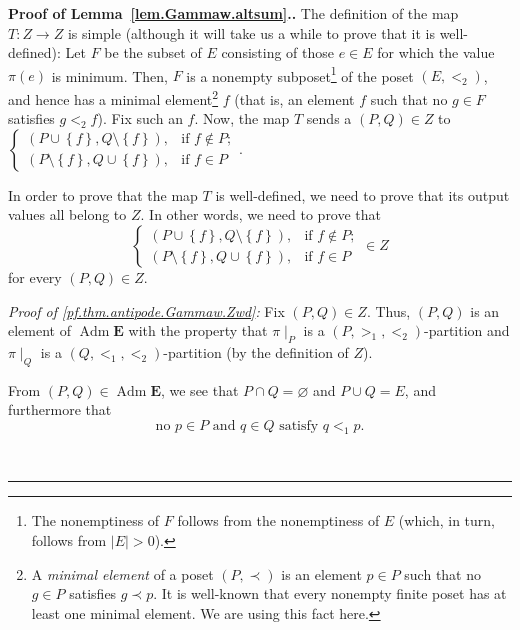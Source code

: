 \documentclass[numbers=enddot,12pt,final,onecolumn,notitlepage,abstracton]{scrartcl}
\theoremstyle{definition}
\newenvironment{proof}[1][Proof]{\noindent\textbf{#1.} }{\ \rule{0.5em}{0.5em}}
\newcommand{\Adm}{\operatorname{Adm}}
\newcommand{\EE}{{\mathbf{E}}}
\begin{document}
\begin{proof}[Proof of Lemma~\ref{lem.Gammaw.altsum}.]
The definition of the map $T : Z \to Z$
is simple (although it will take us a while to prove
that it is well-defined): Let $F$ be the subset of $E$ consisting of those
$e\in E$ for which the value $\pi \left( e \right)$ is minimum.
Then, $F$ is a nonempty
subposet\footnote{The nonemptiness of $F$ follows from the nonemptiness
of $E$ (which, in turn, follows from $\left|E\right| > 0$).}
of the poset $\left(  E,<_{2}\right)  $, and hence has a minimal
element\footnote{A \textit{minimal element} of a poset
$\left(P, \prec\right)$ is an element $p \in P$ such that no
$g \in P$ satisfies $g \prec p$. It is well-known that every nonempty
finite poset has at least one minimal element. We are using this fact
here.}
$f$ (that is, an element $f$ such that no $g\in F$ satisfies $g<_{2}
f$). Fix such an $f$. Now, the map $T$ sends a $\left(  P,Q\right)  \in Z$ to
$
\begin{cases}
\left(  P\cup\left\{  f\right\}  ,Q\setminus\left\{  f\right\}  \right)  , &
\text{if }f\notin P;\\
\left(  P\setminus\left\{  f\right\}  ,Q\cup\left\{  f\right\}  \right)  , &
\text{if }f\in P
\end{cases}
$.

In order to prove that the map $T$ is well-defined, we need to prove that its
output values all belong to $Z$. In other words, we need to prove that
\begin{equation}
\begin{cases}
\left(  P\cup\left\{  f\right\}  ,Q\setminus\left\{  f\right\}  \right)  , &
\text{if }f\notin P;\\
\left(  P\setminus\left\{  f\right\}  ,Q\cup\left\{  f\right\}  \right)  , &
\text{if }f\in P
\end{cases}
\in Z
\label{pf.thm.antipode.Gammaw.Zwd}
\end{equation}
for every $\left(  P,Q\right)  \in Z$.

\textit{Proof of \eqref{pf.thm.antipode.Gammaw.Zwd}:} Fix $\left(  P,Q\right)
\in Z$. Thus, $\left(  P,Q\right)  $ is an element of
$ \Adm \EE$ with the property that
$\pi\mid_{P}$ is a $\left(  P,>_{1},<_{2}\right)  $-partition
and $\pi\mid_{Q}$ is a $\left(  Q,<_{1},<_{2}\right)  $-partition
(by the definition of $Z$).

From $\left(  P,Q\right)  \in \Adm \EE$, we see that
$P\cap Q=\varnothing$ and $P\cup Q=E$, and furthermore that
\begin{equation}
\text{no }p\in P\text{ and }q\in Q\text{ satisfy }q<_{1}
p.
\label{pf.thm.antipode.Gammaw.Zwd.pf.Adm}
\end{equation}


\end{proof}
\end{document}
